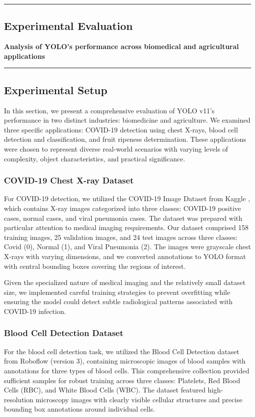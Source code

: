 {\color{gray}\hrule}
\begin{center}
\section{Experimental Evaluation}
\textbf{Analysis of YOLO's performance across biomedical and agricultural applications}
\bigskip
\end{center}
{\color{gray}\hrule}
\begin{multicols}{2}

\subsection{Experimental Setup}
In this section, we present a comprehensive evaluation of YOLO v11's performance in two distinct industries: biomedicine and agriculture. We examined three specific applications: COVID-19 detection using chest X-rays, blood cell detection and classification, and fruit ripeness determination. These applications were chosen to represent diverse real-world scenarios with varying levels of complexity, object characteristics, and practical significance.

\subsubsection{COVID-19 Chest X-ray Dataset}
For COVID-19 detection, we utilized the COVID-19 Image Dataset from Kaggle \citep{Raikokte2020}, which contains X-ray images categorized into three classes: COVID-19 positive cases, normal cases, and viral pneumonia cases. The dataset was prepared with particular attention to medical imaging requirements. Our dataset comprised 158 training images, 25 validation images, and 24 test images across three classes: Covid (0), Normal (1), and Viral Pneumonia (2). The images were grayscale chest X-rays with varying dimensions, and we converted annotations to YOLO format with central bounding boxes covering the regions of interest.

Given the specialized nature of medical imaging and the relatively small dataset size, we implemented careful training strategies to prevent overfitting while ensuring the model could detect subtle radiological patterns associated with COVID-19 infection.

\subsubsection{Blood Cell Detection Dataset}
For the blood cell detection task, we utilized the Blood Cell Detection dataset from Roboflow (version 3), containing microscopic images of blood samples with annotations for three types of blood cells. This comprehensive collection provided sufficient samples for robust training across three classes: Platelets, Red Blood Cells (RBC), and White Blood Cells (WBC). The dataset featured high-resolution microscopy images with clearly visible cellular structures and precise bounding box annotations around individual cells.


\end{multicols}
